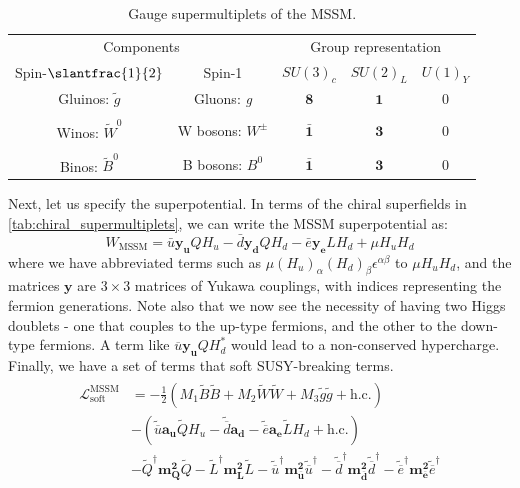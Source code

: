 \begin{table}
  \caption{Gauge supermultiplets of the MSSM.}
  \label{tab:gauge_supermultiplets}
  \begin{tabular}{ccccc}
    \toprule
\multicolumn{2}{c}{Components} & \multicolumn{3}{c}{Group representation} \\ \cmidrule(r){1-2}\cmidrule(l){3-5}
Spin-$\slantfrac{1}{2}$        & Spin-1                                                                         & $SU(3)_c$          & $SU(2)_L$    & $U(1)_Y$\\\midrule
Gluinos: $\widetilde{g}$       & Gluons: \emph{g}                                                               & $\mathbf{8}$       & $\mathbf{1}$ & 0 \\\\
Winos: $\widetilde{W}^0$       & W bosons: $W^\pm$                                                              & $\bar{\mathbf{1}}$ & $\mathbf{3}$ & 0\\\\
Binos: $\widetilde{B}^0$       & B bosons: $B^0$                                                                & $\bar{\mathbf{1}}$ & $\mathbf{3}$ & 0\\
    \bottomrule
  \end{tabular}
\end{table}
Next, let us specify the superpotential. In terms of the chiral superfields in \autoref{tab:chiral_supermultiplets}, we can write the MSSM superpotential as:
\[W_\text{MSSM} = \bar{u}\mathbf{y_u}QH_u-\bar{d}\mathbf{y_d}Q H_d-\bar{e}\mathbf{y_e}L H_d+\mu H_u H_d \]
where we have abbreviated terms such as $\mu(H_u)_\alpha (H_d)_\beta\epsilon^{\alpha\beta}$ to $\mu H_u H_d$, and the matrices $\mathbf{y}$ are $3\times3$ matrices of Yukawa couplings, with indices representing the fermion generations. 
Note also that we now see the necessity of having two Higgs doublets - one that couples to the up-type fermions, and the other to the down-type fermions. A term like $\overline{u}\mathbf{y_u}QH_d^*$ would lead to a non-conserved hypercharge.
Finally, we have a set of terms that soft SUSY-breaking terms.
\begin{align*}
  \begin{split}
    \mathcal{L}_\text{soft}^\text{MSSM} &= -\frac{1}{2}\left(M_1\tilde{B}\tilde{B}+
    M_2\widetilde{W}\widetilde{W} + M_3\widetilde{g}\widetilde{g} + \text{h.c.}\right)\\
    &-\left(\widetilde{\overline{u}}\mathbf{a_u}\widetilde{Q}H_u-\widetilde{\overline{d}}\mathbf{a_d}-\widetilde{\overline{e}}\mathbf{a_e}\widetilde{L}H_d+\text{h.c.}\right)\\
    &-\widetilde{Q}^\dagger\mathbf{m_Q^2}\widetilde{Q}
     -\widetilde{L}^\dagger\mathbf{m_L^2}\widetilde{L}
     -\widetilde{\overline{u}}^\dagger\mathbf{m_{\overline{u}}^2}\widetilde{\overline{u}}^\dagger
     -\widetilde{\overline{d}}^\dagger\mathbf{m_{\overline{d}}^2}\widetilde{\overline{d}}^\dagger
     -\widetilde{\overline{e}}^\dagger\mathbf{m_{\overline{e}}^2}\widetilde{\overline{e}}^\dagger
  \end{split}
\end{align*}
